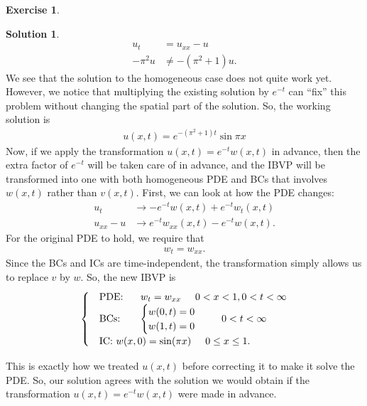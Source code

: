 \documentclass{article}
\theoremstyle{definition}
\newtheorem*{exer*}{Exercise}
\newtheorem*{sln*}{Solution}
\begin{document}
\begin{exer*}
\begin{sln*}
		\begin{align*}
		u_t &= u_{xx} - u\\
		-\pi^2 u &\neq -(\pi^2 + 1)u.
		\end{align*} 
		We see that the solution to the homogeneous case does not quite work yet. However, we notice that multiplying the existing solution by $e^{-t}$ can ``fix'' this problem without changing the spatial part of the solution. So, the working solution is
		\begin{align*}
		\boxed{u(x,t) = e^{-(\pi^2 +1 )t}\sin\pi x}
		\end{align*} 
		Now, if we apply the transformation $u(x,t) = e^{-t}w(x,t)$ in advance, then the extra factor of $e^{-t}$ will be taken care of in advance, and the IBVP will be transformed into one with both homogeneous PDE and BCs that involves $w(x,t)$ rather than $v(x,t)$. First, we can look at how the PDE changes:
		\begin{align*}
		u_t &\to -e^{-t}w(x,t) + e^{-t}w_t(x,t)\\
		u_{xx} - u &\to e^{-t}w_{xx}(x,t) - e^{-t}w(x,t).
		\end{align*}
		For the original PDE to hold, we require that
		\begin{align*}
		w_t = w_{xx}.
		\end{align*}
		Since the BCs and ICs are time-independent, the transformation simply allows us to replace $v$ by $w$. So, the new IBVP is
		\begin{align*}
		\begin{cases}
		&\text{PDE: }\hspace{0.5cm} w_t = w_{xx}\hspace{0.5cm} 0<x<1, 0 < t < \infty\\
		&\text{BCs: }\hspace{0.5cm} \begin{cases}
		w(0,t) = 0\\
		w(1,t) = 0
		\end{cases}\hspace{0.5cm} 0 < t < \infty\\
		&\text{IC: } w(x,0) = \sin(\pi x) \hspace{0.5cm} 0 \leq x \leq 1.
		\end{cases}
		\end{align*}
		
		This is exactly how we treated $u(x,t)$ before correcting it to make it solve the PDE. So, our solution agrees with the solution we would obtain if the transformation $u(x,t) = e^{-t}w(x,t)$ were made in advance.
		
	\end{sln*}
	
\end{exer*}
\end{document}
